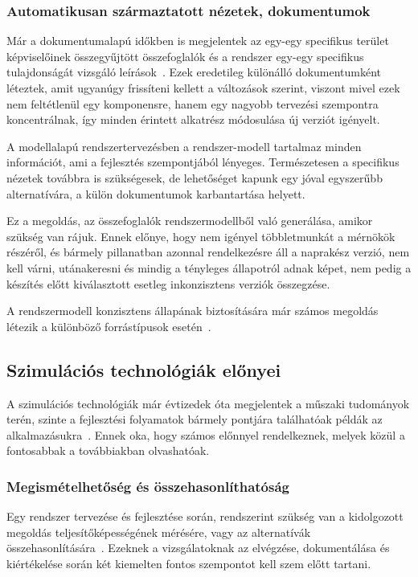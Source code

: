         \subsubsection{Automatikusan származtatott nézetek, dokumentumok}
        Már a dokumentumalapú időkben is megjelentek az egy-egy specifikus terület képviselőinek összegyűjtött összefoglalók és a rendszer egy-egy specifikus tulajdonságát vizsgáló leírások~\cite{Bajaj_2022}.
        Ezek eredetileg különálló dokumentumként léteztek, amit ugyanúgy frissíteni kellett a változások szerint, viszont mivel ezek nem feltétlenül egy komponensre, hanem egy nagyobb tervezési szempontra koncentrálnak, így minden érintett alkatrész módosulása új verziót igényelt.
        
        A modellalapú rendszertervezésben a rendszer-modell tartalmaz minden információt, ami a fejlesztés szempontjából lényeges.
        Természetesen a specifikus nézetek továbbra is szükségesek, de lehetőséget kapunk egy jóval egyszerűbb alternatívára, a külön dokumentumok karbantartása helyett.
        
        Ez a megoldás, az összefoglalók rendszermodellből való generálása, amikor szükség van rájuk. Ennek előnye, hogy nem igényel többletmunkát a mérnökök részéről, és bármely pillanatban azonnal rendelkezésre áll a naprakész verzió, nem kell várni, utánakeresni és mindig a tényleges állapotról adnak képet, nem pedig a készítés előtt kiválasztott esetleg inkonzisztens verziók összegzése\cite{Madni_2018}.
        
        A rendszermodell konzisztens állapának biztosítására már számos megoldás létezik a különböző forrástípusok esetén~\cite{Git2024, LieberLieber2024}.

    \subsection{Szimulációs technológiák előnyei}
    A szimulációs technológiák már évtizedek óta megjelentek a műszaki tudományok terén, szinte a fejlesztési folyamatok bármely pontjára találhatóak példák az alkalmazásukra~\cite{Gianni2017}.
    Ennek oka, hogy számos előnnyel rendelkeznek, melyek közül a fontosabbak a továbbiakban olvashatóak.

        \subsubsection{Megismételhetőség és összehasonlíthatóság}
        Egy rendszer tervezése és fejlesztése során, rendszerint szükség van a kidolgozott megoldás teljesítőképességének mérésére, vagy az alternatívák összehasonlítására~\cite{Gianni2017}.
        Ezeknek a vizsgálatoknak az elvégzése, dokumentálása és kiértékelése során két kiemelten fontos szempontot kell szem előtt tartani.
        
